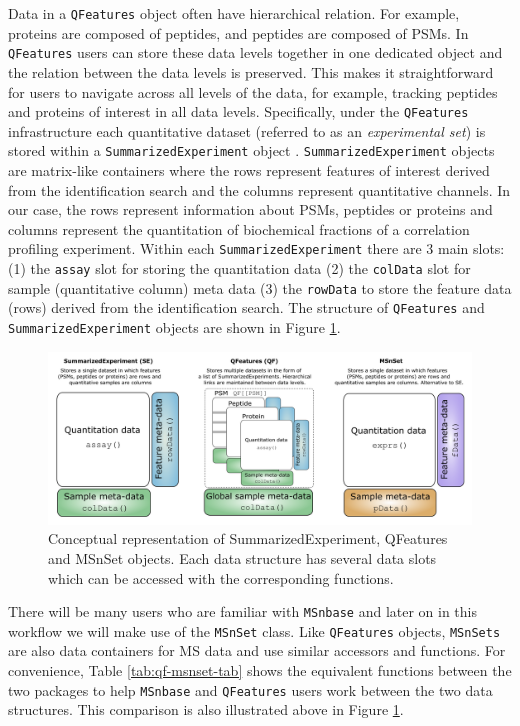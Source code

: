 \documentclass[9pt,a4paper,]{extarticle}
\begin{document}
Data in a \texttt{QFeatures} object often have hierarchical relation. For example,
proteins are composed of peptides, and peptides are composed of PSMs. In
\texttt{QFeatures} users can store these data levels together in one dedicated object and
the relation between the data levels is preserved. This makes it straightforward
for users to navigate across all levels of the data, for example, tracking peptides
and proteins of interest in all data levels. Specifically, under the \texttt{QFeatures}
infrastructure each quantitative dataset (referred to as
an \emph{experimental set}) is stored within a \texttt{SummarizedExperiment} object \citep{SumExp}.
\texttt{SummarizedExperiment} objects are matrix-like containers where the rows represent
features of interest derived from the identification search and the columns represent
quantitative channels. In our case, the rows represent information about PSMs,
peptides or proteins and columns represent the quantitation of biochemical fractions
of a correlation profiling experiment. Within each \texttt{SummarizedExperiment} there are
3 main slots: (1) the \texttt{assay} slot for storing the quantitation data (2) the
\texttt{colData} slot for sample (quantitative column) meta data (3) the \texttt{rowData} to
store the feature data (rows) derived from the identification search. The
structure of \texttt{QFeatures} and \texttt{SummarizedExperiment} objects are shown in
Figure \ref{fig:qf-picture}.

\begin{figure}[H]

{\centering \includegraphics[width=0.9\linewidth,]{figs/se_and_qf_and_msnset} 

}

\caption{Conceptual representation of SummarizedExperiment, QFeatures and MSnSet objects. Each data structure has several data slots which can be accessed with the corresponding functions.}\label{fig:qf-picture}
\end{figure}

There will be many users who are familiar with \texttt{MSnbase} and later on in this
workflow we will make use of the \texttt{MSnSet} class. Like \texttt{QFeatures} objects,
\texttt{MSnSets} are also data containers for MS data and use similar accessors and functions.
For convenience, Table \ref{tab:qf-msnset-tab} shows the equivalent functions
between the two packages to help \texttt{MSnbase} and \texttt{QFeatures} users work between
the two data structures. This comparison is also illustrated above in Figure \ref{fig:qf-picture}.
\end{document}
